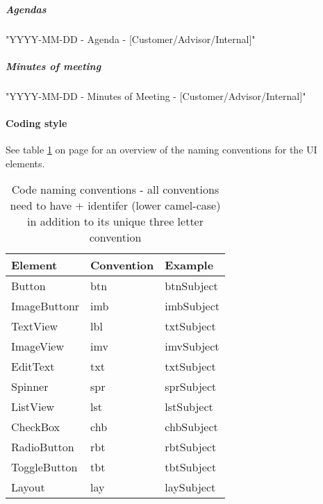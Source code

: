 \subparagraph{Agendas}\hfill
\newline
"YYYY-MM-DD - Agenda - [Customer/Advisor/Internal]"

\subparagraph{Minutes of meeting}\hfill
\newline
"YYYY-MM-DD - Minutes of Meeting - [Customer/Advisor/Internal]"

\paragraph{Coding style}\hfill
\newline
See table \ref{tab:namingconventions} on page \pageref{tab:namingconventions} for an overview of the naming conventions for the UI elements.
\begin{table}
\begin{tabular}{l|l|l} \hline
\textbf{Element} & \textbf{Convention} & \textbf{Example} \\ \hline \hline
Button & btn & btnSubject \\
ImageButtonr & imb & imbSubject \\
TextView & lbl & txtSubject \\
ImageView & imv & imvSubject \\
EditText & txt & txtSubject \\
Spinner & spr & sprSubject \\
ListView & lst & lstSubject \\
CheckBox & chb & chbSubject \\
RadioButton & rbt & rbtSubject \\
ToggleButton & tbt & tbtSubject \\
Layout & lay & laySubject \\ \hline 
\end{tabular}
\caption{Code naming conventions - all conventions need to have + identifer (lower camel-case) in addition to its unique three letter convention }\label{tab:namingconventions}
\end{table}
